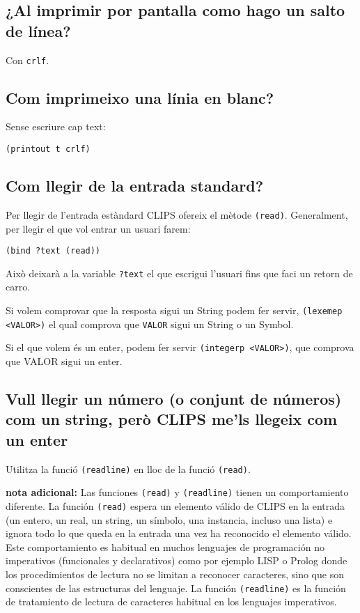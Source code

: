 \documentclass[11pt,svgnames]{scrbook}
\begin{document}
\subsection{¿Al imprimir por pantalla como hago un salto de línea?}

Con \texttt{crlf}.

\subsection{Com imprimeixo una línia en blanc?}

Sense escriure cap text:
\medskip

\texttt{(printout t crlf)}




\subsection{Com llegir de la entrada standard?}


Per llegir de l'entrada estàndard CLIPS ofereix el mètode \texttt{(read)}.
Generalment, per llegir el que vol entrar un usuari farem:
\medskip

\texttt{(bind ?text (read))}
\medskip

Això deixarà a la variable \texttt{?text} el que escrigui l'usuari fins que faci
un retorn de carro.

Si volem comprovar que la resposta sigui un String podem fer
servir, \texttt{(lexemep
<VALOR>)} el qual comprova que \texttt{VALOR} sigui  un String o un Symbol.

Si el que volem és un enter, podem fer servir \texttt{(integerp <VALOR>)}, que
comprova que VALOR sigui un enter.


\subsection{Vull llegir un número (o conjunt de números) com un string, però
CLIPS me'ls
llegeix com un enter}

Utilitza la funció \texttt{(readline)} en lloc de la funció \texttt{(read)}.
\medskip

{\bf nota adicional:} Las funciones \texttt{(read)} y \texttt{(readline)} tienen un comportamiento
diferente. La función \texttt{(read)} espera un elemento válido de CLIPS en la entrada (un entero,
un real, un string, un símbolo, una instancia, incluso una lista) e ignora todo lo que queda en la
entrada una vez ha reconocido el elemento válido. Este comportamiento es habitual en muchos
lenguajes de programación no imperativos (funcionales y declarativos) como por ejemplo LISP o Prolog
donde los procedimientos de lectura no se limitan a reconocer caracteres, sino que son conscientes
de las estructuras del lenguaje. La función \texttt{(readline)} es la función de tratamiento de
lectura de caracteres habitual en los lenguajes imperativos.
\end{document}
